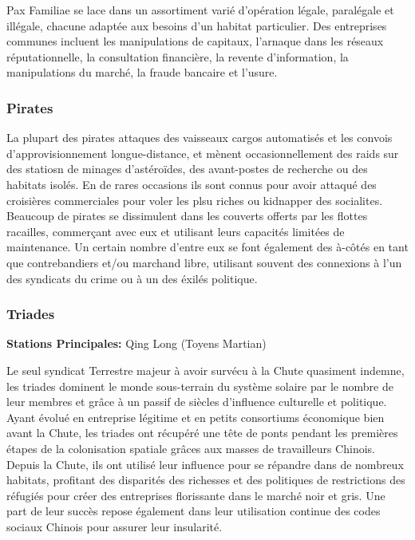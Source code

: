 Pax Familiae se lace dans un assortiment varié d'opération légale, paralégale et illégale, chacune adaptée aux besoins d'un habitat particulier. Des entreprises communes incluent les manipulations de capitaux, l'arnaque dans les réseaux réputationnelle, la consultation financière, la revente d'information, la manipulations du marché, la fraude bancaire et l'usure. 

\subsubsection{Pirates} \label{sec:pirates} 

La plupart des pirates attaques des vaisseaux cargos automatisés et les convois d'approvisionnement longue-distance, et mènent occasionnellement des raids sur des statiosn de minages d'astéroïdes, des avant-postes de recherche ou des habitats isolés. En de rares occasions ils sont connus pour avoir attaqué des croisières commerciales pour voler les plsu riches ou kidnapper des socialites. Beaucoup de pirates se dissimulent dans les couverts offerts par les flottes racailles, commerçant avec eux et utilisant leurs capacités limitées de maintenance. Un certain nombre d'entre eux se font également des à-côtés en tant que contrebandiers et/ou marchand libre, utilisant souvent des connexions à l'un des syndicats du crime ou à un des éxilés politique. 

\subsubsection{Triades} \label{sec:triads} 

\textbf{Stations Principales:} Qing Long (Toyens Martian) 

Le seul syndicat Terrestre majeur à avoir survécu à la Chute quasiment indemne, les triades dominent le monde sous-terrain du système solaire par le nombre de leur membres et grâce à un passif de siècles d'influence culturelle et politique. Ayant évolué en entreprise légitime et en petits consortiums économique bien avant la Chute, les triades ont récupéré une tête de ponts pendant les premières étapes de la colonisation spatiale grâces aux masses de travailleurs Chinois. Depuis la Chute, ils ont utilisé leur influence pour se répandre dans de nombreux habitats, profitant des disparités des richesses et des politiques de restrictions des réfugiés pour créer des entreprises florissante dans le marché noir et gris. Une part de leur succès repose également dans leur utilisation continue des codes sociaux Chinois pour assurer leur insularité. 

